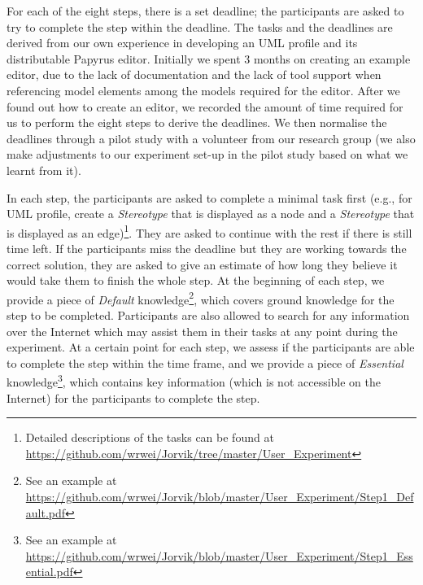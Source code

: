 For each of the eight steps, there is a set deadline; the participants are asked to try to complete the step within the deadline.
The tasks and the deadlines are derived from our own experience in developing an UML profile and its distributable Papyrus editor. 
Initially we spent 3 months on creating an example editor, due to the lack of documentation and the lack of tool support when referencing model elements among the models required for the editor.
After we found out how to create an editor, we recorded the amount of time required for us to perform the eight steps to derive the deadlines. 
We then normalise the deadlines through a pilot study with a volunteer from our research group (we also make adjustments to our experiment set-up in the pilot study based on what we learnt from it). 

In each step, the participants are asked to complete a minimal task first (e.g., for UML profile, create a \textit{Stereotype} that is displayed as a node and a \textit{Stereotype} that is displayed as an edge)\footnote{Detailed descriptions of the tasks can be found at \url{https://github.com/wrwei/Jorvik/tree/master/User_Experiment}}. 
They are asked to continue with the rest if there is still time left. 
If the participants miss the deadline but they are working towards the correct solution, they are asked to give an estimate of how long they believe it would take them to finish the whole step.
At the beginning of each step, we provide a piece of \textit{Default} knowledge\footnote{See an example at \url{https://github.com/wrwei/Jorvik/blob/master/User_Experiment/Step1_Default.pdf}}, which covers ground knowledge for the step to be completed. 
Participants are also allowed to search for any information over the Internet which may assist them in their tasks at any point during the experiment.
At a certain point for each step, we assess if the participants are able to complete the step within the time frame, and we provide a piece of \textit{Essential} knowledge\footnote{See an example at \url{https://github.com/wrwei/Jorvik/blob/master/User_Experiment/Step1_Essential.pdf}}, which contains key information (which is not accessible on the Internet) for the participants to complete the step.

